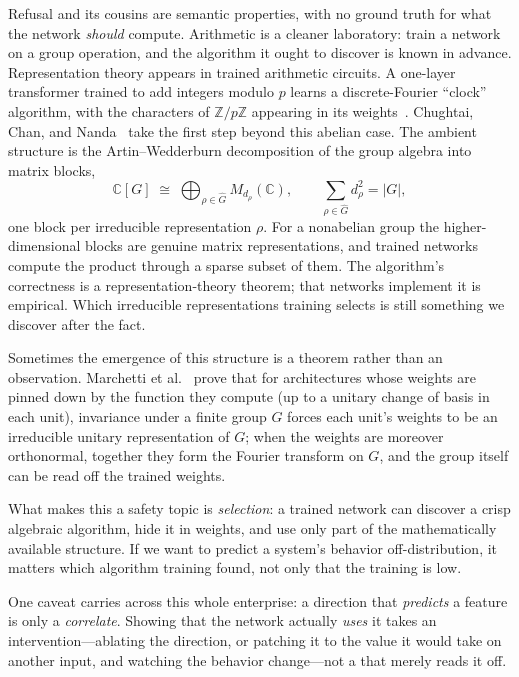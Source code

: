Refusal and its cousins are semantic properties, with no ground truth for what the network \emph{should} compute. Arithmetic is a cleaner laboratory: train a network on a group operation, and the algorithm it ought to discover is known in advance. Representation theory appears in trained arithmetic circuits. A one-layer transformer trained to add integers modulo $p$ learns a discrete-Fourier ``clock'' algorithm, with the characters of $\mathbb{Z}/p\mathbb{Z}$ appearing in its weights~\cite{nanda2023}. Chughtai, Chan, and Nanda~\cite{chughtai2023} take the first step beyond this abelian case. The ambient structure is the Artin--Wedderburn decomposition of the group algebra into matrix blocks,
\[
   \mathbb{C}[G]\;\cong\;\bigoplus_{\rho\in\widehat{G}} M_{d_\rho}(\mathbb{C}),
   \qquad \sum_{\rho\in\widehat{G}} d_\rho^{2}=\lvert G\rvert,
\]
one block per irreducible representation $\rho$. For a nonabelian group the higher-dimensional blocks are genuine matrix representations, and trained networks compute the product through a sparse subset of them. The algorithm's correctness is a representation-theory theorem; that networks implement it is empirical. Which irreducible representations training selects is still something we discover after the fact.

Sometimes the emergence of this structure is a theorem rather than an observation. Marchetti et al.~\cite{marchetti2024} prove that for architectures whose weights are pinned down by the function they compute (up to a unitary change of basis in each unit), invariance under a finite group $G$ forces each unit's weights to be an irreducible unitary representation of $G$; when the weights are moreover orthonormal, together they form the Fourier transform on $G$, and the group itself can be read off the trained weights.

What makes this a safety topic is \emph{selection}: a trained network can discover a crisp algebraic algorithm, hide it in weights, and use only part of the mathematically available structure. If we want to predict a system's behavior off-distribution, it matters which algorithm training found, not only that the training  is low.

One caveat carries across this whole enterprise: a direction that \emph{predicts} a feature is only a \emph{correlate}. Showing that the network actually \emph{uses} it takes an intervention---ablating the direction, or patching it to the value it would take on another input, and watching the behavior change---not a  that merely reads it off.

